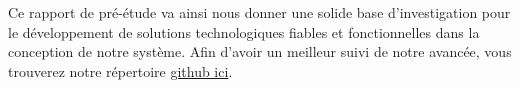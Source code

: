 \documentclass[a4paper,12pt]{report}
\begin{document}
	Ce rapport de pré-étude va ainsi nous donner une solide base d'investigation pour le développement de solutions technologiques fiables et fonctionnelles dans la conception de notre système. Afin d'avoir un meilleur suivi de notre avancée, vous trouverez notre répertoire \href{https://github.com/tristanplouz/ProjetGE2}{github ici}.
	
	\listoffigures
	
	 
	
	
\end{document}

